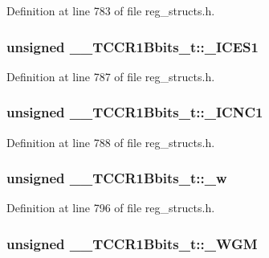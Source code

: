Definition at line 783 of file reg\+\_\+structs.\+h.

\hypertarget{union_____t_c_c_r1_bbits__t_a138964a58b5f449e30f82c85bcd292d6}{
\subsubsection[{\+\_\+\+I\+C\+E\+S1}]{\setlength{\rightskip}{0pt plus 5cm}unsigned \+\_\+\+\_\+\+T\+C\+C\+R1\+Bbits\+\_\+t\+::\+\_\+\+I\+C\+E\+S1}}\label{union_____t_c_c_r1_bbits__t_a138964a58b5f449e30f82c85bcd292d6}


Definition at line 787 of file reg\+\_\+structs.\+h.

\hypertarget{union_____t_c_c_r1_bbits__t_ac728f9f558a46bbc8b3b509ea3296201}{
\subsubsection[{\+\_\+\+I\+C\+N\+C1}]{\setlength{\rightskip}{0pt plus 5cm}unsigned \+\_\+\+\_\+\+T\+C\+C\+R1\+Bbits\+\_\+t\+::\+\_\+\+I\+C\+N\+C1}}\label{union_____t_c_c_r1_bbits__t_ac728f9f558a46bbc8b3b509ea3296201}


Definition at line 788 of file reg\+\_\+structs.\+h.

\hypertarget{union_____t_c_c_r1_bbits__t_af620642d160649b819fcbaf3a268f255}{
\subsubsection[{\+\_\+w}]{\setlength{\rightskip}{0pt plus 5cm}unsigned \+\_\+\+\_\+\+T\+C\+C\+R1\+Bbits\+\_\+t\+::\+\_\+w}}\label{union_____t_c_c_r1_bbits__t_af620642d160649b819fcbaf3a268f255}


Definition at line 796 of file reg\+\_\+structs.\+h.

\hypertarget{union_____t_c_c_r1_bbits__t_a7776e68b8de59bb52ac6062226c30d9f}{
\subsubsection[{\+\_\+\+W\+G\+M}]{\setlength{\rightskip}{0pt plus 5cm}unsigned \+\_\+\+\_\+\+T\+C\+C\+R1\+Bbits\+\_\+t\+::\+\_\+\+W\+G\+M}}\label{union_____t_c_c_r1_bbits__t_a7776e68b8de59bb52ac6062226c30d9f}



